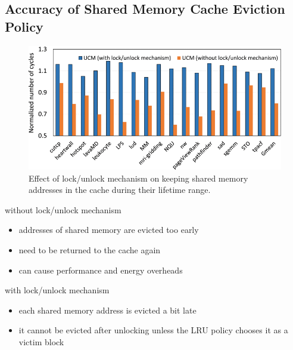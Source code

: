 \documentclass[
    fontset=fandol,
    xcolor=svgnames %
]{ctexbeamer}
\begin{document}
\subsection{Accuracy of Shared Memory Cache Eviction Policy}

\begin{frame}

    \begin{figure}
        \includegraphics[width=1\textwidth]{assets/figure/sadro16-3154315-large.png}
        \caption{Effect of lock/unlock mechanism on keeping shared memory addresses in the cache during their lifetime range.}
    \end{figure}

\end{frame}

\begin{frame}

    \begin{block}{without lock/unlock mechanism}
        \begin{itemize}
            \item addresses of shared memory are evicted too early
            \item need to be returned to the cache again
            \item can cause performance and energy overheads
        \end{itemize}
    \end{block}

    \begin{block}{with lock/unlock mechanism}
        \begin{itemize}
            \item each shared memory address is evicted a bit late
            \item it cannot be evicted after unlocking unless the LRU policy chooses it as a victim block
        \end{itemize}
    \end{block}

\end{frame}
\end{document}
